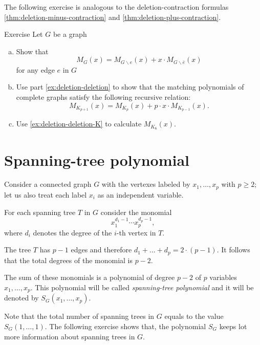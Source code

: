 The following exercise is analogous to the deletion-contraction formulas \ref{thm:deletion-minus-contraction} and \ref{thm:deletion-plus-contraction}.

\begin{thm}{Exercise}\label{ex:deletion-deletion-total}
Let $G$ be a graph
\begin{enumerate}[(a)]
\item\label{ex:deletion-deletion} Show that
\[M_G(x)=M_{G\backslash e}(x)+x\cdot M_{G\backslash \bar e}(x)\]
for any edge $e$ in $G$

\item\label{ex:deletion-deletion-K} Use part \ref{ex:deletion-deletion} to show that the matching polynomials of complete graphs satisfy the following recursive relation:
\[M_{K_{p+1}}(x)=M_{K_{p}}(x)+p\cdot x\cdot M_{K_{p-1}}(x).\]

\item Use \ref{ex:deletion-deletion-K} to calculate $M_{K_6}(x)$. 
\end{enumerate}

\end{thm}

\section*{Spanning-tree polynomial}

Consider a connected graph $G$ with the vertexes labeled by $x_1,\dots,x_p$ with $p\ge 2$;
let us also treat each label $x_i$ as an independent variable.

For each spanning tree $T$ in $G$ consider the monomial 
\[x_1^{d_1-1}\cdots x_p^{d_p-1},\]
where $d_i$ denotes the degree of the $i$-th vertex in $T$.

The tree $T$ has $p-1$ edges and therefore 
$d_1+\dots+d_p=2\cdot(p-1)$.
It follows that the total degrees of the monomial is $p-2$.

The sum of these monomials is a polynomial of degree $p-2$ of $p$ variables $x_1,\dots, x_p$.
This polynomial will be called \emph{spanning-tree polynomial} and it will be denoted by 
$S_G(x_1,\dots,x_p)$.

Note that the total number of spanning trees in $G$ equals to the value
$S_G(1,\dots,1)$.
The following exercise shows that,
the polynomial $S_G$ keeps lot more information about spanning trees in $G$.

